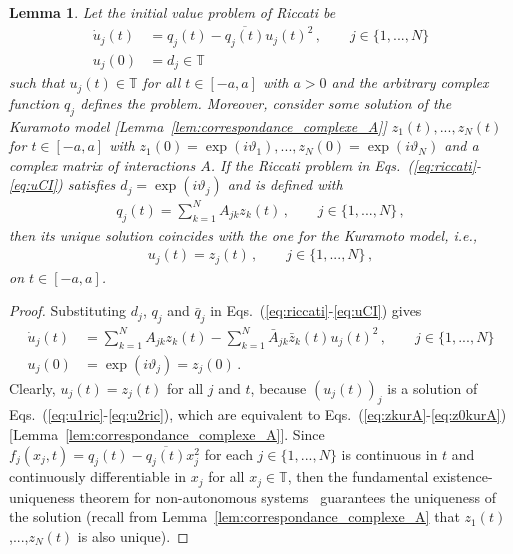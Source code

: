 \documentclass[aps,pre,reprint,longbibliography,superscriptaddress,noshowpacs,floatfix]{revtex4-2}
\newtheorem{lemma}{Lemma}
\theoremstyle{definition}
\theoremstyle{remark}
\begin{document}
\begin{lemma}\label{lem:correspondance_nonautonome}
    Let the initial value problem of Riccati be
    \begin{align}
        \dot{u}_j(t) &= q_j(t) - \overline{q_j(t)}u_j(t)^2\,,\qquad j\in\{1,...,N\}\label{eq:riccati}\\
        u_j(0) &= d_j \in \mathbb{T} \label{eq:uCI}
    \end{align} %
    such that $u_j(t)\in\mathbb{T}$ for all $t \in [-a, a]$ with $a > 0$ and the arbitrary complex function $q_j$ defines the problem. Moreover, consider some solution of the Kuramoto model [Lemma~\ref{lem:correspondance_complexe_A}] $z_1(t), ..., z_N(t)$ for $t \in [-a, a]$ with $z_1(0) = \exp(i\vartheta_1), ..., z_N(0) = \exp(i\vartheta_N)$ and a complex matrix of interactions $A$. If the Riccati problem in Eqs.~(\ref{eq:riccati}-\ref{eq:uCI}) satisfies $d_j = \exp(i\vartheta_j)$ and is defined with
    \begin{align}\label{eq:pj_to_qj}
        q_j(t) = \textstyle{\sum_{k=1}^N} A_{jk}z_k(t)\,, \qquad j\in\{1,...,N\}\,,%
    \end{align}
    then its unique solution coincides with the one for the Kuramoto model, i.e.,
    \begin{align*}
        u_j(t) = z_j(t)\,,\qquad j\in\{1,...,N\}\,,
    \end{align*}
    on $t \in [-a, a]$. 
\end{lemma}
\begin{proof}
    Substituting $d_j$, $q_j$ and $\bar{q}_j$ in Eqs.~(\ref{eq:riccati}-\ref{eq:uCI}) gives
    \begin{align}
        \dot{u}_j(t) &= \sum_{k=1}^N A_{jk}z_k(t)  - \sum_{k=1}^N \bar{A}_{jk}\bar{z}_k(t)u_j(t)^2\,, \qquad j\in\{1,...,N\}\label{eq:u1ric}\\
        u_j(0) &= \exp(i\vartheta_j) = z_j(0)\label{eq:u2ric}\,.
    \end{align} 
    Clearly, $u_j(t) = z_j(t)$ for all $j$ and $t$, because $(u_j(t))_j$ is a solution of Eqs.~(\ref{eq:u1ric}-\ref{eq:u2ric}), which are equivalent to Eqs.~(\ref{eq:zkurA}-\ref{eq:z0kurA}) [Lemma~\ref{lem:correspondance_complexe_A}]. Since $f_j(x_j, t) = q_j(t) - \overline{q_j(t)}x_j^2$ for each $j\in\{1, ..., N\}$ is continuous in $t$ and continuously differentiable in $x_j$ for all $x_j\in\mathbb{T}$, then the fundamental existence-uniqueness theorem for non-autonomous systems~\cite[p.77]{Perko2001} guarantees the uniqueness of the solution (recall from Lemma~\ref{lem:correspondance_complexe_A} that $z_1(t)$,...,$z_N(t)$ is also unique).
\end{proof}
\end{document}
